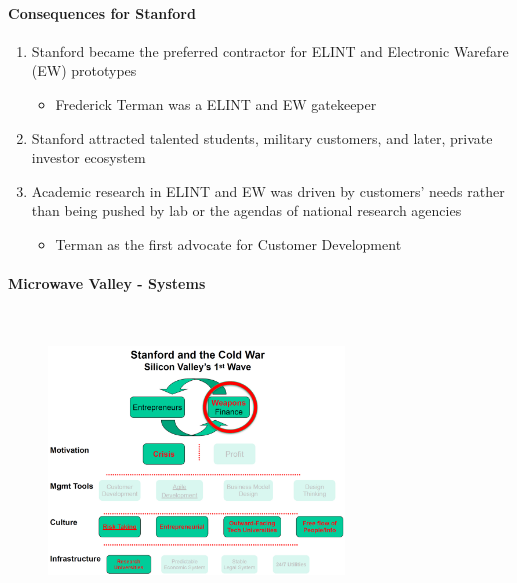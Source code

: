 \paragraph{Consequences for Stanford}

\begin{enumerate}
    \item Stanford became the preferred contractor for ELINT and Electronic
        Warefare (EW) prototypes
        \begin{itemize}
            \item Frederick Terman was a ELINT and EW gatekeeper
        \end{itemize}
    \item Stanford attracted talented students, military customers, and
        later, private investor ecosystem
    \item Academic research in ELINT and EW was driven by customers' needs
        rather than being pushed by lab or the agendas of national research
        agencies
        \begin{itemize}
            \item Terman as the first advocate for Customer Development
        \end{itemize}
\end{enumerate}

\paragraph{Microwave Valley - Systems}

\

\begin{figure}[H]
    \centering
    \includegraphics[width=0.7\textwidth]{Pictures/Stanford_cold_war_1.png}
\end{figure}

